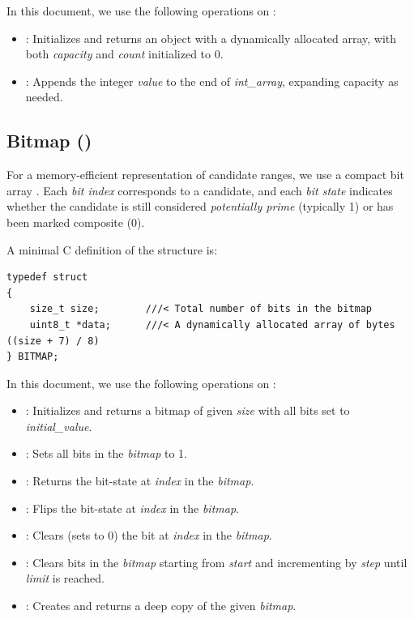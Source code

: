 \documentclass{article}
\begin{document}
In this document, we use the following operations on :
\begin{itemize}[noitemsep]
    \item {}: Initializes and returns an  object with a dynamically allocated array, with both \emph{capacity} and \emph{count} initialized to 0.
    \item {}: Appends the integer \emph{value} to the end of \emph{int\_array}, expanding capacity as needed.
\end{itemize}

\subsection{Bitmap ()} \label{sec:bitmap}

For a memory-efficient representation of candidate ranges, we use a compact bit array . Each \emph{bit index} corresponds to a candidate, and each \emph{bit state} indicates whether the candidate is still considered \emph{potentially prime} (typically 1) or has been marked composite (0).

A minimal C definition of the  structure is:
\begin{verbatim}
typedef struct
{
    size_t size;        ///< Total number of bits in the bitmap
    uint8_t *data;      ///< A dynamically allocated array of bytes ((size + 7) / 8)
} BITMAP;
\end{verbatim}

In this document, we use the following operations on :
\begin{itemize}[noitemsep]
    \item {}: Initializes and returns a bitmap of given \emph{size} with all bits set to \emph{initial\_value}.
    \item {}: Sets all bits in the \emph{bitmap} to 1.
    \item {}: Returns the bit-state at \emph{index} in the \emph{bitmap}.
    \item {}: Flips the bit-state at \emph{index} in the \emph{bitmap}.
    \item {}: Clears (sets to 0) the bit at \emph{index} in the \emph{bitmap}.
    \item {}: Clears bits in the \emph{bitmap} starting from \emph{start} and incrementing by \emph{step} until \emph{limit} is reached.
    \item {}: Creates and returns a deep copy of the given \emph{bitmap}.
\end{itemize}
\end{document}
